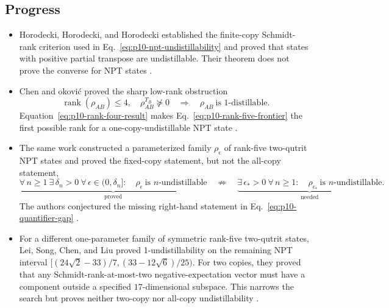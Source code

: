 \subsection*{Progress}

\begin{itemize}
  \item Horodecki, Horodecki, and Horodecki established the finite-copy
  Schmidt-rank criterion used in
  Eq.~\eqref{eq:p10-npt-undistillability} and proved that states with positive
  partial transpose are undistillable.  Their theorem does not prove the
  converse for NPT states
  .

  \item Chen and \DJ okovi\'c proved the sharp low-rank obstruction
  \begin{equation}
    \operatorname{rank}(\rho_{AB})\leq4,
    \quad \rho_{AB}^{T_B}\not\succeq0
    \quad\Longrightarrow\quad
    \rho_{AB}\ \text{is 1-distillable}.
    \label{eq:p10-rank-four-result}
  \end{equation}
  Equation~\eqref{eq:p10-rank-four-result} makes
  Eq.~\eqref{eq:p10-rank-five-frontier} the first possible rank for a
  one-copy-undistillable NPT state
  .

  \item The same work constructed a parameterized family $\rho_\epsilon$ of
  rank-five two-qutrit NPT states and proved the fixed-copy statement, but not
  the all-copy statement,
  \begin{equation}
    \underbrace{\forall\,n\geq1\ \exists\,\delta_n>0\ 
      \forall\,\epsilon\in(0,\delta_n]:\quad
      \rho_\epsilon\ \text{is $n$-undistillable}}_{\text{proved}}
    \quad\not\Longrightarrow\quad
    \underbrace{\exists\,\epsilon_*>0\ \forall\,n\geq1:\quad
      \rho_{\epsilon_*}\ \text{is $n$-undistillable}}_{\text{needed}}.
    \label{eq:p10-quantifier-gap}
  \end{equation}
  The authors conjectured the missing right-hand statement in
  Eq.~\eqref{eq:p10-quantifier-gap}
  .

  \item For a different one-parameter family of symmetric rank-five
  two-qutrit states, Lei, Song, Chen, and Liu proved 1-undistillability on the
  remaining NPT interval
  $[(24\sqrt{2}-33)/7,(33-12\sqrt{6})/25)$.  For two copies, they proved that
  any Schmidt-rank-at-most-two negative-expectation vector must have a
  component outside a specified $17$-dimensional subspace.  This narrows the
  search but proves neither two-copy nor all-copy undistillability
  \sourcecite{ref:p10-lei-et-al}{LSC+26}.


\end{itemize}
